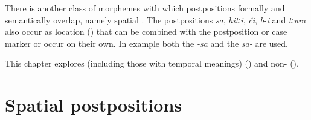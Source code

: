 There is another class of morphemes with which postpositions formally and semantically overlap, namely spatial . The postpositions \textit{sa}, \textit{hitːi}, \textit{či}, \textit{b}-\textit{i} and \textit{tːura} also occur as location  () that can be combined with the postposition or case marker or occur on their own. In example  both the  \textit{-sa} and the  \textit{sa-} are used.

This chapter explores  (including those with temporal meanings) () and non- (). 


\section{Spatial postpositions}
\label{sec:Spatialpostpositions}

